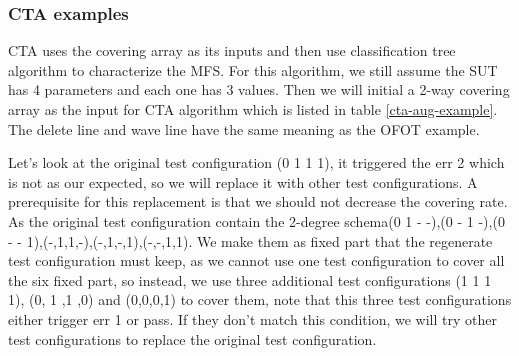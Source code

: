 \documentclass{sig-alternate}
\begin{document}
\subsubsection{CTA examples}
CTA uses the covering array as its inputs and then use classification tree algorithm to characterize the MFS. For this algorithm, we still assume the SUT has 4 parameters and each one has 3 values. Then we will initial a 2-way covering array as the input for CTA algorithm which is listed in table \ref{cta-aug-example}. The delete line and wave line have the same meaning as the OFOT example.

Let's look at the original test configuration (0 1 1 1), it triggered the err 2 which is not as our expected, so we will replace it with other test configurations. A prerequisite for this replacement is that we should not decrease the covering rate. As the original test configuration contain the 2-degree schema(0 1 - -),(0 - 1 -),(0 - - 1),(-,1,1,-),(-,1,-,1),(-,-,1,1). We make them as fixed part that the regenerate test configuration must keep, as we cannot use one test configuration to cover all the six fixed part, so instead,  we use three additional test configurations (1 1 1 1), (0, 1 ,1 ,0) and (0,0,0,1) to cover them, note that this three test configurations either trigger err 1 or pass. If they don't match this condition, we will try other test configurations to replace the original test configuration.
\end{document}
